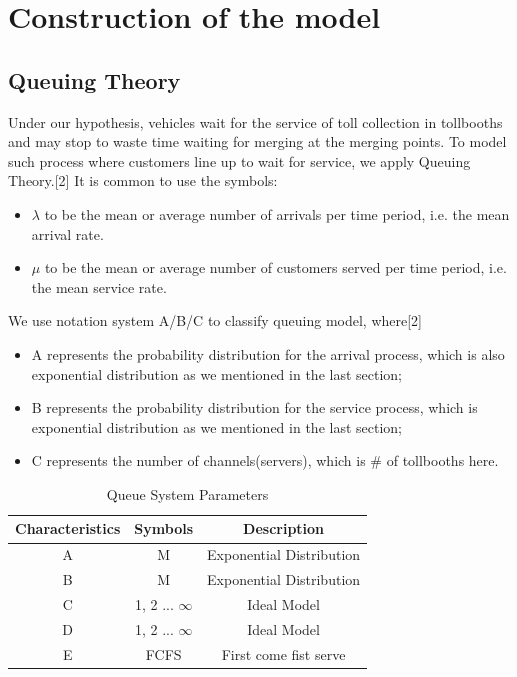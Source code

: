 \section{Construction of the model}
\subsection{Queuing Theory}
Under our hypothesis, vehicles wait for the service of toll collection in tollbooths and may stop to waste time waiting for merging at the merging points. To model such process where customers line up to wait for service, we apply Queuing Theory.[2] It is common to use the symbols:
\begin{itemize}
\item $\lambda$ to be the mean or average number of arrivals per time period, i.e. the mean arrival rate.
\item $\mu$ to be the mean or average number of customers served per time period, i.e. the mean service rate.
\end{itemize}
We use notation system A/B/C to classify queuing model, where[2]
\begin{itemize}
\item A represents the probability distribution for the arrival process, which is also exponential distribution as we mentioned in the last section;
\item B represents the probability distribution for the service process, which is exponential distribution as we mentioned in the last section;
\item C represents the number of channels(servers), which is \# of tollbooths here.
\end{itemize}

\begin{table}[h]
\begin{center}
 \begin{tabular}{||c c c||} 
 \hline
 Characteristics & Symbols & Description \\ [0.5ex] 
 \hline\hline
 A & M & Exponential Distribution \\ 
 \hline
 B & M & Exponential Distribution \\
 \hline
 C & 1, 2 ... $\infty$ & Ideal Model \\
 \hline
 D & 1, 2 ... $\infty$ & Ideal Model \\
 \hline
 E & FCFS & First come fist serve \\ [1ex] 
 \hline
\end{tabular}
\caption{Queue System Parameters}
\label{table:1}
\end{center}
\end{table}

